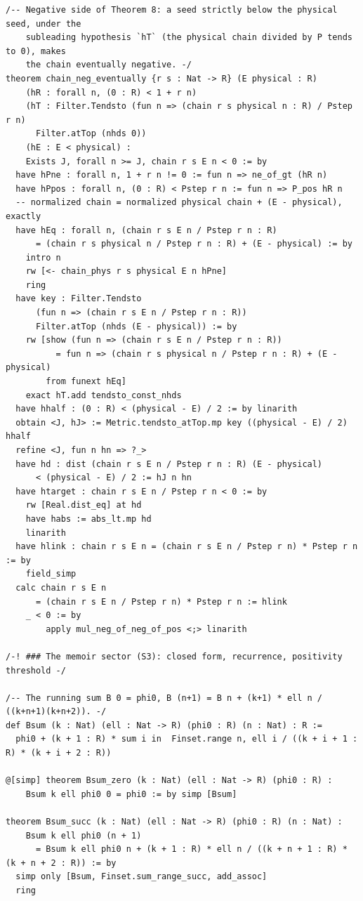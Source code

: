 \documentclass[11pt]{article}
\theoremstyle{remark}
\begin{document}
\begin{verbatim}
/-- Negative side of Theorem 8: a seed strictly below the physical seed, under the
    subleading hypothesis `hT` (the physical chain divided by P tends to 0), makes
    the chain eventually negative. -/
theorem chain_neg_eventually {r s : Nat -> R} (E physical : R)
    (hR : forall n, (0 : R) < 1 + r n)
    (hT : Filter.Tendsto (fun n => (chain r s physical n : R) / Pstep r n)
      Filter.atTop (nhds 0))
    (hE : E < physical) :
    Exists J, forall n >= J, chain r s E n < 0 := by
  have hPne : forall n, 1 + r n != 0 := fun n => ne_of_gt (hR n)
  have hPpos : forall n, (0 : R) < Pstep r n := fun n => P_pos hR n
  -- normalized chain = normalized physical chain + (E - physical), exactly
  have hEq : forall n, (chain r s E n / Pstep r n : R)
      = (chain r s physical n / Pstep r n : R) + (E - physical) := by
    intro n
    rw [<- chain_phys r s physical E n hPne]
    ring
  have key : Filter.Tendsto
      (fun n => (chain r s E n / Pstep r n : R))
      Filter.atTop (nhds (E - physical)) := by
    rw [show (fun n => (chain r s E n / Pstep r n : R))
          = fun n => (chain r s physical n / Pstep r n : R) + (E - physical)
        from funext hEq]
    exact hT.add tendsto_const_nhds
  have hhalf : (0 : R) < (physical - E) / 2 := by linarith
  obtain <J, hJ> := Metric.tendsto_atTop.mp key ((physical - E) / 2) hhalf
  refine <J, fun n hn => ?_>
  have hd : dist (chain r s E n / Pstep r n : R) (E - physical)
      < (physical - E) / 2 := hJ n hn
  have htarget : chain r s E n / Pstep r n < 0 := by
    rw [Real.dist_eq] at hd
    have habs := abs_lt.mp hd
    linarith
  have hlink : chain r s E n = (chain r s E n / Pstep r n) * Pstep r n := by
    field_simp
  calc chain r s E n
      = (chain r s E n / Pstep r n) * Pstep r n := hlink
    _ < 0 := by
        apply mul_neg_of_neg_of_pos <;> linarith

/-! ### The memoir sector (S3): closed form, recurrence, positivity threshold -/

/-- The running sum B 0 = phi0, B (n+1) = B n + (k+1) * ell n / ((k+n+1)(k+n+2)). -/
def Bsum (k : Nat) (ell : Nat -> R) (phi0 : R) (n : Nat) : R :=
  phi0 + (k + 1 : R) * sum i in  Finset.range n, ell i / ((k + i + 1 : R) * (k + i + 2 : R))

@[simp] theorem Bsum_zero (k : Nat) (ell : Nat -> R) (phi0 : R) :
    Bsum k ell phi0 0 = phi0 := by simp [Bsum]

theorem Bsum_succ (k : Nat) (ell : Nat -> R) (phi0 : R) (n : Nat) :
    Bsum k ell phi0 (n + 1)
      = Bsum k ell phi0 n + (k + 1 : R) * ell n / ((k + n + 1 : R) * (k + n + 2 : R)) := by
  simp only [Bsum, Finset.sum_range_succ, add_assoc]
  ring


\end{verbatim}
\end{document}
